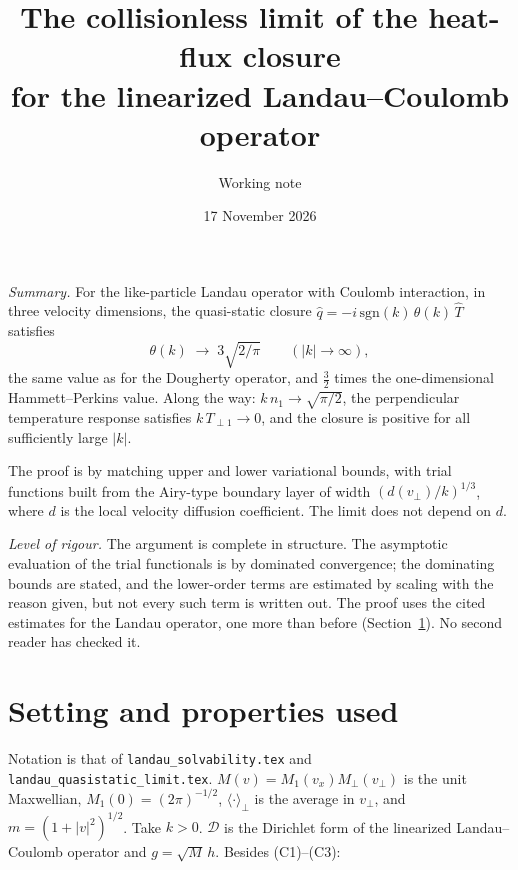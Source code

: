 \documentclass[11pt]{article}
\title{The collisionless limit of the heat-flux closure\\
for the linearized Landau--Coulomb operator}
\author{Working note}
\date{17 November 2026}
\newcommand{\cD}{\mathcal{D}}
\newcommand{\avg}[1]{\langle #1\rangle}
\theoremstyle{remark}
\begin{document}
\sloppy
\maketitle

\noindent\emph{Summary.} For the like-particle Landau operator with Coulomb
interaction, in three velocity dimensions, the quasi-static closure
$\hat q=-i\,\mathrm{sgn}(k)\,\theta(k)\,\hat T$ satisfies
\[
  \theta(k)\;\longrightarrow\;3\sqrt{2/\pi}\qquad(|k|\to\infty),
\]
the same value as for the Dougherty operator, and $\tfrac32$ times the
one-dimensional Hammett--Perkins value. Along the way: $k\,n_1\to\sqrt{\pi/2}$,
the perpendicular temperature response satisfies $k\,T_{\perp1}\to0$, and the
closure is positive for all sufficiently large $|k|$.

The proof is by matching upper and lower variational bounds, with trial
functions built from the Airy-type boundary layer of width
$(d(v_\perp)/k)^{1/3}$, where $d$ is the local velocity diffusion
coefficient. The limit does not depend on $d$.

\emph{Level of rigour.} The argument is complete in structure. The
asymptotic evaluation of the trial functionals is by dominated convergence;
the dominating bounds are stated, and the lower-order terms are estimated by
scaling with the reason given, but not every such term is written out. The
proof uses the cited estimates for the Landau operator, one more than
before (Section~\ref{sec:prop}). No second reader has checked it.

\section{Setting and properties used}
\label{sec:prop}

Notation is that of \texttt{landau\_solvability.tex} and
\texttt{landau\_quasistatic\_limit.tex}. $M(v)=M_1(v_x)M_\perp(v_\perp)$ is
the unit Maxwellian, $M_1(0)=(2\pi)^{-1/2}$, $\avg{\cdot}_\perp$ is the
average in $v_\perp$, and $m=(1+|v|^2)^{1/2}$. Take $k>0$. $\cD$ is the
Dirichlet form of the linearized Landau--Coulomb operator and
$g=\sqrt M\,h$. Besides (C1)--(C3):
\end{document}
